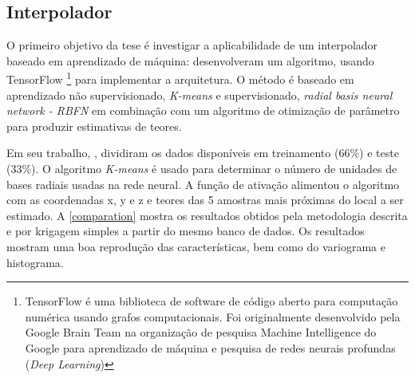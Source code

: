 \subsection{Interpolador}

O primeiro objetivo da tese é investigar a aplicabilidade de um interpolador baseado em aprendizado de máquina:  desenvolveram um algoritmo, usando TensorFlow \footnote{TensorFlow é uma biblioteca de software de código aberto para computação numérica usando grafos computacionais. Foi originalmente desenvolvido pela Google Brain Team na organização de pesquisa Machine Intelligence do Google para aprendizado de máquina e pesquisa de redes neurais profundas (\textit{Deep Learning})} para implementar a arquitetura. O método é baseado em aprendizado não supervisionado, \textit{K-means} e supervisionado, \textit{radial basis neural network - RBFN} em combinação com um algoritmo de otimização de parâmetro para produzir estimativas de teores. 

Em seu trabalho, , dividiram os dados disponíveis em treinamento (66\%) e teste (33\%). O algoritmo \textit{K-means} é usado para determinar o número de unidades de bases radiais usadas na rede neural. A função de ativação  alimentou o algoritmo com as coordenadas x, y e z e teores das 5 amostras mais próximas do local a ser estimado. A \autoref{comparation} mostra os resultados obtidos pela metodologia descrita e por krigagem simples a partir do mesmo banco de dados. Os resultados mostram uma boa reprodução das características, bem como do variograma e histograma.

